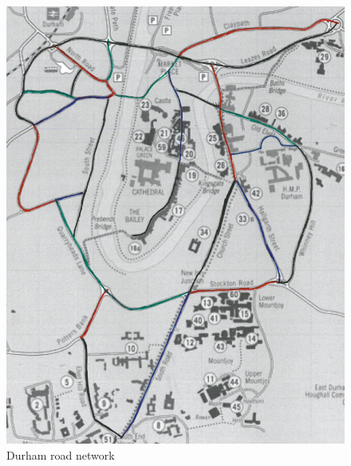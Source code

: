 \documentclass[11pt]{report}
\begin{document}
\begin{figure}[h]
\centering
\includegraphics[width=\linewidth]{durham_with_colour.jpg}
\caption{Durham road network}
\label{fig:durham map}
\end{figure}
\end{document}
